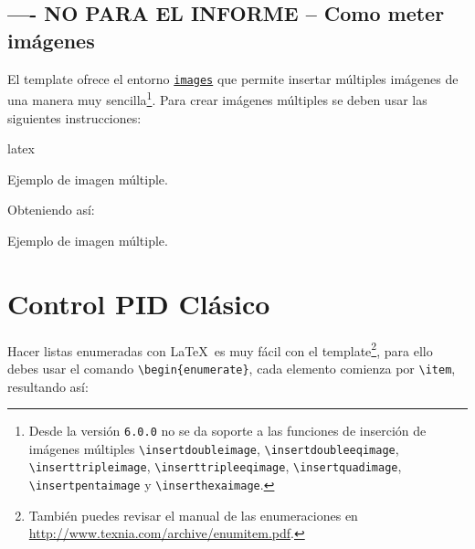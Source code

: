 	\subsection{---- NO PARA EL INFORME -- Como meter imágenes}

	El template ofrece el entorno \href{https://latex.ppizarror.com/informe.html#hlp-images}{\texttt{images}} que permite insertar múltiples imágenes de una manera muy sencilla\footnote{Desde la versión \texttt{6.0.0} no se da soporte a las funciones de inserción de imágenes múltiples \texttt{\textbackslash insertdoubleimage}, \texttt{\textbackslash insertdoubleeqimage}, \texttt{\textbackslash inserttripleimage}, \texttt{\textbackslash inserttripleeqimage}, \texttt{\textbackslash insertquadimage}, \texttt{\textbackslash insertpentaimage} y \texttt{\textbackslash inserthexaimage}.}. Para crear imágenes múltiples se deben usar las siguientes instrucciones:

\begin{sourcecode}{latex}{}
\begin{images}[\label{imagenmultiple}]{Ejemplo de imagen múltiple.}
	\imagesnewline
\end{images}
\end{sourcecode}

	Obteniendo así:

	\begin{images}{Ejemplo de imagen múltiple.}
		\imagesnewline
	\end{images}


\newpage
\section{Control PID Clásico}


		Hacer listas enumeradas con \LaTeX\ es muy fácil con el template\footnote{También puedes revisar el manual de las enumeraciones en \url{http://www.texnia.com/archive/enumitem.pdf}.}, para ello debes usar el comando \texttt{\textbackslash begin\{enumerate\}}, cada elemento comienza por \texttt{\textbackslash item}, resultando así:

